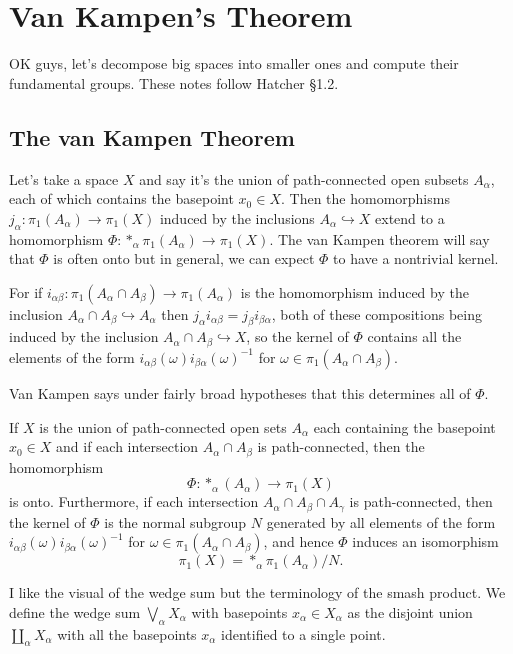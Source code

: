 \section{Van Kampen's Theorem}
OK guys, let's decompose big spaces into smaller ones and compute their fundamental groups. These notes follow Hatcher \S 1.2.
\subsection{The van Kampen Theorem}
Let's take a space $X$ and say it's the union of path-connected open subsets $A_{\alpha}$, each of which contains the basepoint $x_0\in X$. Then the homomorphisms $j_{\alpha} \colon \pi_1(A_{\alpha}) \to \pi_1(X)$ induced by the inclusions $A_{\alpha}\hookrightarrow X$ extend to a homomorphism $\Phi \colon *_{\alpha}\pi_1(A_{\alpha}) \to \pi_1(X)$. The van Kampen theorem will say that $\Phi$ is often onto but in general, we can expect $\Phi$ to have a nontrivial kernel. 

For if $i_{\alpha\beta} \colon  \pi_1(A_{\alpha}\cap A_{\beta}) \to \pi_1(A_{\alpha})$ is the homomorphism induced by the inclusion $A_{\alpha}\cap A_{\beta}\hookrightarrow A_{\alpha}$ then $j_{\alpha}i_{\alpha\beta}=j_{\beta}i_{\beta\alpha}$, both of these compositions being induced by the inclusion $A_{\alpha}\cap A_{\beta}\hookrightarrow X$, so the kernel of $\Phi$ contains all the elements of the form $i_{\alpha\beta}(\omega)i_{\beta\alpha}(\omega)^{-1}$ for $\omega \in \pi_1(A_{\alpha}\cap A_{\beta})$. 

Van Kampen says under fairly broad hypotheses that this determines all of $\Phi$.

\begin{theorem}
    If $X$ is the union of path-connected open sets $A_{\alpha}$ each containing the basepoint $x_0\in X$ and if each intersection $A_{\alpha}\cap A_{\beta}$ is path-connected, then the homomorphism \[
        \Phi \colon *_{\alpha}(A_{\alpha}) \to \pi_1(X)
    \] is onto. Furthermore, if each intersection $A_{\alpha}\cap A_{\beta}\cap A_{\gamma}$ is path-connected, then the kernel of $\Phi$ is the normal subgroup $N$ generated by all elements of the form $i_{\alpha\beta}(\omega)i_{\beta\alpha}(\omega)^{-1}$ for $\omega \in \pi_1(A_{\alpha}\cap A_{\beta})$, and hence $\Phi$ induces an isomorphism \[
    \pi_1(X)=*_{\alpha}\pi_1(A_{\alpha}) /N.
    \] 
\end{theorem}
\begin{example}
    I like the visual of the wedge sum but the terminology of the smash product. We define the wedge sum $\bigvee_{\alpha}X_{\alpha}$ with basepoints $x_{\alpha}\in X_{\alpha}$ as the disjoint union $\amalg_{\alpha}X_{\alpha}$ with all the basepoints $x_{\alpha}$ identified to a single point.
\end{example}


